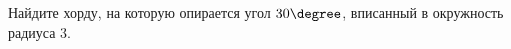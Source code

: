 \begin{ex}
	\begin{condition}
		Найдите хорду, на которую опирается угол \( 30\degree \), вписанный в окружность радиуса \( 3 \).
	\end{condition}
\end{ex}